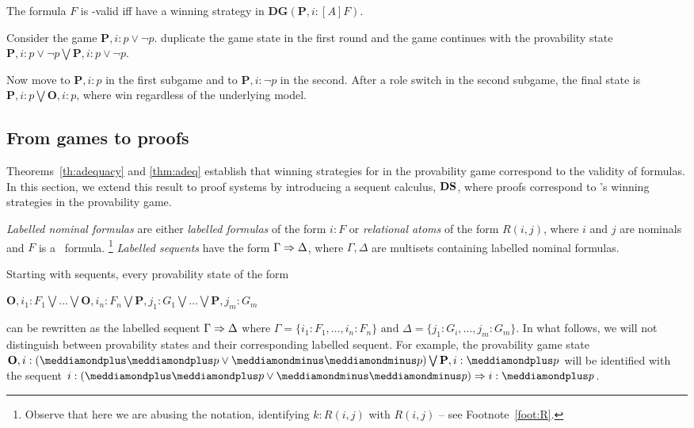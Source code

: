 \begin{corollary}
The formula $F $ is  \PNL-valid iff \Ic have a winning strategy in $\mathbf{DG}(\mathbf{P},i:[A]F )$.
\end{corollary}

\begin{example}
Consider  the game $\mathbf{P},i: p \vee \neg p$.
\Ic duplicate the game state in the first round and the
game continues with the provability state $\mathbf{P},i: p \vee \neg
p\bigvee \mathbf{P},i: p \vee \neg p$. 

Now \Ic move to $\mathbf{P},i: p$ in the
first subgame and to $\mathbf{P},i:\neg p$ in the second. After a role switch
in the second subgame, the final state is $\mathbf{P},i: p \bigvee
\mathbf{O},i: p$, where \Ic win regardless of the underlying model.
\end{example}

\subsection{From games to proofs}\label{sec:proofs}

Theorems~\ref{th:adequacy} and \ref{thm:adeq} establish that winning strategies for \Me in the provability game correspond to the validity of formulas. In this section, we extend this result to proof systems by introducing a sequent calculus, 
$\mathbf{DS}$, where proofs correspond to \My's winning strategies in the provability game.

{\em Labelled nominal formulas} are either \emph{labelled formulas} of
the form $i: F $ or \emph{relational atoms} of the form $R(i,j)$,
where $i$ and $j$ are nominals and $ F $ is a \PNL~formula.%
\footnote{Observe that here we are abusing the notation, identifying $k:R(i,j)$ with $R(i,j)$ -- see Footnote~\ref{foot:R}.} \emph{Labelled sequents} have the form $\Gamma \Rightarrow \Delta$, where
$\Gamma,\Delta$ are multisets containing labelled nominal formulas.

Starting with sequents, every provability state of the form
\begin{center}
$
\mathbf{O},i_1:  F_1\bigvee \ldots \bigvee \mathbf{O},i_n:  F_n\bigvee\mathbf{P},j_1: G_1 \bigvee \ldots \bigvee \mathbf{P},j_m: G_m
$
\end{center}
 can be rewritten as the labelled sequent $\Gamma \Rightarrow \Delta$ where
$
\Gamma =\{i_1: F_1, \ldots, i_n: F_n\}\mbox{ and } \Delta =\{j_1: G_i,\ldots,j_m: G_m\}
$. 
In what follows, we will not distinguish between provability states and their corresponding labelled sequent. For example,
the provability game state
$\mathbf{O},i:(\dplus\dplus p \vee \dminus\dminus p)\bigvee\mathbf{P},i: \dplus p$
will be identified with the sequent  
$i:(\dplus\dplus p \vee \dminus\dminus p)\seq i: \dplus p$.

